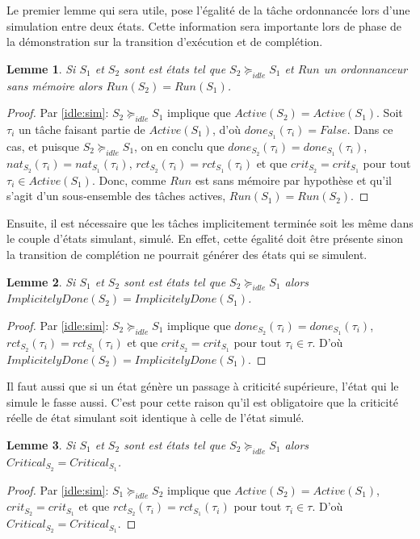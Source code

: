 \documentclass[12pt,a4paper,oneside]{book}
\theoremstyle{break}
\theoremstyle{breakplain}
\newtheorem{lem}{Lemme}[chapter]
\begin{document}
Le premier lemme qui sera utile, pose l'égalité de la tâche ordonnancée lors d'une simulation entre deux états. Cette information sera importante lors de phase de la démonstration sur la transition d'exécution et de complétion.

\begin{lem}
\label{idle:runeq}
Si $S_1$ et $S_2$ sont est états tel que $S_2 \succeq_{idle}S_1$ et $Run$ un ordonnanceur sans mémoire alors $Run (S_2) = Run(S_1)$.
\end{lem}
\begin{proof} Par \autoref{idle:sim}: $S_2 \succeq_{idle} S_1$ implique que $Active(S_2) = Active(S_1)$. Soit $\tau_i$ un tâche faisant partie de $Active(S_1)$, d'où $done_{S_1}(\tau_i) = False$. Dans ce cas, et puisque $S_2 \succeq_{idle} S_1$, on en conclu que $done_{S_2}(\tau_i) = done_{S_1}(\tau_i)$, $nat_{S_2}(\tau_i) = nat_{S_1}(\tau_i)$, $rct_{S_2}(\tau_i) = rct_{S_1}(\tau_i)$ et que $crit_{S_2} = crit_{S_1}$ pour tout $\tau_i \in Active(S_1)$. Donc, comme $Run$ est sans mémoire par hypothèse et qu'il s'agit d'un sous-ensemble des tâches actives, $Run(S_1) = Run(S_2)$.
\end{proof}

Ensuite, il est nécessaire que les tâches implicitement terminée soit les même dans le couple d'états simulant, simulé. En effet, cette égalité doit être présente sinon la transition de complétion ne pourrait générer des états qui se simulent.

\begin{lem}
\label{idle:impdoneeq}
Si $S_1$ et $S_2$ sont est états tel que $S_2 \succeq_{idle} S_1$ alors $ImplicitelyDone(S_2) = ImplicitelyDone(S_1)$.
\end{lem}
\begin{proof} Par \autoref{idle:sim}: $S_2 \succeq_{idle} S_1$ implique que $done_{S_2}(\tau_i) = done_{S_1}(\tau_i)$, $rct_{S_2}(\tau_i) = rct_{S_1}(\tau_i)$ et que $crit_{S_2} = crit_{S_1}$ pour tout $\tau_i \in \tau$. D'où $ImplicitelyDone(S_2) = ImplicitelyDone(S_1)$.
\end{proof}

Il faut aussi que si un état génère un passage à criticité supérieure, l'état qui le simule le fasse aussi. C'est pour cette raison qu'il est obligatoire que la criticité réelle de état simulant soit identique à celle de l'état simulé.

\begin{lem}
\label{idle:criteq}
Si $S_1$ et $S_2$ sont est états tel que $S_2 \succeq_{idle} S_1$ alors $Critical_{S_2} = Critical_{S_1}$.
\end{lem}
\begin{proof} Par \autoref{idle:sim}: $S_1 \succeq_{idle} S_2$ implique que $Active(S_2) = Active(S_1)$, $crit_{S_2} = crit_{S_1}$ et que $rct_{S_2}(\tau_i) = rct_{S_1}(\tau_i)$ pour tout $\tau_i \in \tau$. D'où $Critical_{S_2} = Critical_{S_1}$.
\end{proof}
\end{document}
